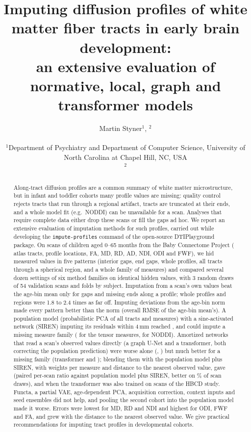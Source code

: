 \documentclass[11pt]{article}
\title{Imputing diffusion profiles of white matter fiber tracts in early brain development:\\
\large an extensive evaluation of normative, local, graph and transformer models}
\author{Martin Styner$^{1}$, \todo{coauthors}$^{2}$\\[4pt]
\parbox{0.9\textwidth}{\centering\small $^{1}$Department of Psychiatry and Department of Computer Science, University
of North Carolina at Chapel Hill, NC, USA \todo{verify affiliation wording}\\ $^{2}$\todo{affiliations}}}
\date{\todo{date / corresponding author e-mail}}
\begin{document}
\maketitle

\begin{abstract}
\noindent Along-tract diffusion profiles are a common summary of white matter microstructure, but in infant and
toddler cohorts many profile values are missing: quality control rejects tracts that run through a regional
artifact, tracts are truncated at their ends, and a whole model fit (e.g.\ NODDI) can be unavailable for a scan.
Analyses that require complete data either drop these scans or fill the gaps ad hoc. We report an extensive
evaluation of imputation methods for such profiles, carried out while developing the \texttt{impute-profiles}
command of the open-source DTIPlayground package. On \bcpscans{} scans of \bcpsubjects{} children aged 0--65 months
from the Baby Connectome Project (\bcptracts{} atlas tracts, \bcppositions{} profile locations, FA, MD, RD, AD, NDI, ODI and FWF), we hid
measured values in five patterns (interior gaps, end gaps, whole profiles, all tracts through a spherical region,
and a whole family of measures) and compared several dozen settings of six method families on identical hidden values,
with 3 random draws of 54 validation scans and folds by subject. Imputation from a scan's own values beat the
age-bin mean only for gaps and missing ends along a profile; whole profiles and regions were 1.8 to 2.4 times as far
off. Imputing deviations
from the age-bin norm made every pattern better than the norm (overall RMSE \rPtwoSiren{} of the age-bin mean's). A
population model (probabilistic PCA of all tracts and measures) with a sine-activated network (SIREN) imputing its
residuals within 4\,mm reached \rDefault{}, and could impute a missing measure family (\rDefaultWdti{} for the tensor
measures, \rDefaultWnoddi{} for NODDI). Amortized networks that read a scan's observed values directly (a graph U-Net
and a transformer, both correcting the population prediction) were worse alone (\rUnet{}, \rTfFour{}) but much
better for a missing family (transformer \rTfFourWdti{} and \rTfFourWnoddi{}); blending them with the population
model plus SIREN, with weights per measure and distance to the nearest observed value, gave \rFinal{} (paired per-scan
ratio \cORatio{} against population model plus SIREN, better on \cOBetter\% of scan draws), and \rRefFinal{} when the
transformer was also trained on \hbcdscans{} scans of the HBCD study. Functa, a partial VAE, age-dependent PCA, acquisition
correction, context inputs and seed ensembles did not help, and pooling the second cohort into the population model
made it worse. Errors were lowest for MD, RD and NDI and highest for ODI, FWF and FA, and grew with the distance to the
nearest observed value. We give practical recommendations for imputing tract profiles in developmental cohorts.
\end{abstract}
\end{document}
